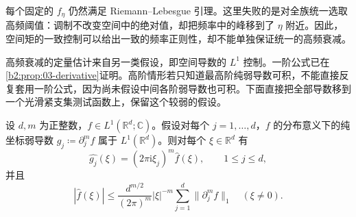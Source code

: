 每个固定的 \(f_\eta\) 仍然满足 Riemann--Lebesgue 引理。这里失败的是对全族统一选取高频阈值：调制不改变空间中的绝对值，却把频率中的峰移到了 \(\eta\) 附近。因此，空间矩的一致控制可以给出一致的频率正则性，却不能单独保证统一的高频衰减。

\ProseParagraphBreak

高频衰减的定量估计来自另一类假设，即空间导数的 \(L^1\) 控制。一阶公式已在\cref{b2:prop:03-derivative}证明。高阶情形若只知道最高阶纯弱导数可积，不能直接反复套用一阶公式，因为尚未假设中间各阶弱导数也可积。下面直接把全部导数移到一个光滑紧支集测试函数上，保留这个较弱的假设。

\begin{proposition}\label{b2:prop:03-higher-derivative-decay}
设 \(d,m\) 为正整数，\(f\in L^1(\mathbb R^d;\mathbb C)\)。假设对每个 \(j=1,\ldots,d\)，\(f\) 的分布意义下的纯坐标弱导数 \(g_j\coloneqq\partial_j^m f\) 属于 \(L^1(\mathbb R^d)\)。则对每个 \(\xi\in\mathbb R^d\) 有
\[
 \widehat{g_j}(\xi)=(2\pi\mathrm i\xi_j)^m\widehat f(\xi),
 \qquad 1\leq j\leq d,
\]
并且
\[
 |\widehat f(\xi)|
 \leq\frac{d^{m/2}}{(2\pi)^m}|\xi|^{-m}
       \sum_{j=1}^d\|\partial_j^m f\|_1
 \quad(\xi\ne0).
\]
\end{proposition}
